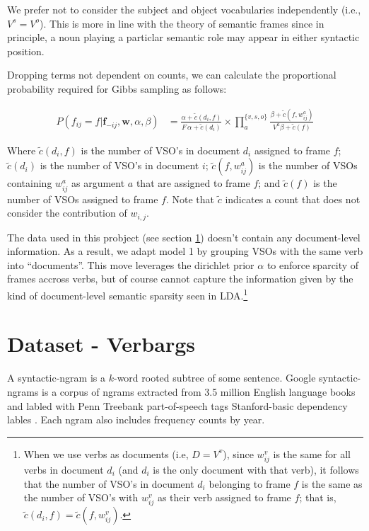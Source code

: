 \documentclass{article} %
\begin{document}
We prefer not to consider the subject and object vocabularies independently 
(i.e., $V^s = V^o$). This is more in line with the theory of semantic frames 
since in principle, a noun playing a particlar semantic role may appear in either 
syntactic position.

Dropping terms not dependent on counts, we can calculate the proportional
probability required for Gibbs sampling as follows:

\begin{align}
P(f_{ij} = f|\mathbf{f}_{-ij},\mathbf{w}, \alpha,\beta)
&=\frac{\alpha + \tilde c(d_i,f)}{F\,\alpha + \tilde c(d_i)}
\times \prod_a^{\{v,s,o\}}\frac{\beta+\tilde c(f,w_{ij}^a)}{V^a\beta+\tilde c(f)}
\end{align}

Where $\tilde c (d_i, f)$ is the number of VSO's in document $d_i$ assigned to frame $f$;
$\tilde c(d_i)$ is the number of VSO's in document $i$;
$\tilde c(f,w_{ij}^a)$ is the number of VSOs containing $w_{ij}^a$ as argument $a$ that are
assigned to frame $f$; and
$\tilde c(f)$ is the number of VSOs assigned to frame $f$.
Note that $\tilde c$ indicates a count that does not consider the contribution of 
$w_{i,j}$.

The data used in this probject (see section \ref{data}) doesn't contain any document-level
information. As a result, we adapt model 1 by grouping VSOs with the same verb into ``documents''.
This move leverages the dirichlet prior $\alpha$ to enforce sparcity of frames 
accross verbs, but of course cannot capture the information given by the kind of
document-level semantic sparsity seen in LDA.\footnote{When we use verbs as
documents (i.e, $D = V^v$), since $w_{ij}^v$ is the same for all verbs in document $d_i$ 
(and $d_i$ is the only document with that verb), it follows that the number of VSO's in document 
$d_i$ belonging to frame $f$ is the same as the number of VSO's with $w_{ij}^v$ as their verb assigned to 
frame $f$; that is, $\tilde c(d_i, f) = \tilde c(f, w_{ij}^v)$.}

\section{Dataset - Verbargs}
\label{data}

A syntactic-ngram is a $k$-word rooted subtree of some sentence.
Google syntactic-ngrams is a corpus of ngrams extracted from 3.5 million English language 
books and labled with Penn Treebank part-of-speech tags Stanford-basic dependency 
lables \citep{ngrams2013}.
Each ngram also includes frequency counts by year.
\end{document}
